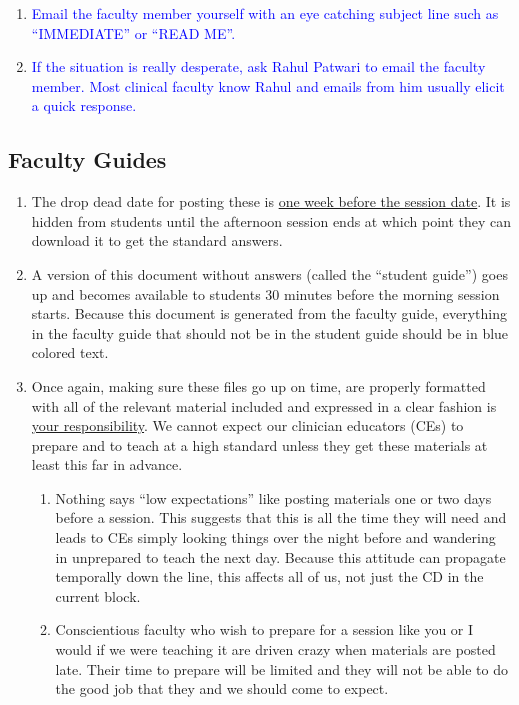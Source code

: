 \documentclass[11pt]{article}
\newcommand{\trsem}[1]{\textcolor{blue}{#1}}
\begin{document}
\begin{enumerate}
  \begin{enumerate}
    \def\labelenumii{\trsem{\alph{enumii}.}}
  \item \trsem{Email the faculty member yourself with an eye catching subject line such as ``IMMEDIATE'' or ``READ ME''.}
  \item \trsem{If the situation is really desperate, ask Rahul Patwari to email the faculty member.  Most clinical faculty know Rahul and emails from him usually elicit a quick response.}
  \end{enumerate}
\end{enumerate}

\subsection*{Faculty Guides}
\begin{enumerate}
\item  The drop dead date for posting these is \underline{one week before the session date}.  It is hidden from students until the afternoon session ends at which point they can download it to get the standard answers.
\item A version of this document without answers (called the ``student guide'') goes up and becomes available to students 30 minutes before the morning session starts.  Because this document is generated from the faculty guide, everything in the faculty guide that should not be in the student guide should be in blue colored text.
\item Once again, making sure these files go up on time, are properly formatted with all of the relevant material included and expressed in a clear fashion is \underline{your responsibility}.  We cannot expect our clinician educators (CEs) to prepare and to teach at a high standard unless they get these materials at least this far in advance.
  \begin{enumerate}
  \item Nothing says ``low expectations'' like posting materials one or two days before a session.  This suggests that this is all the time they will need and leads to CEs simply looking things over the night before and wandering in unprepared to teach the next day.  Because this attitude can propagate temporally down the line, this affects all of us, not just the CD in the current block.
  \item Conscientious faculty who wish to prepare for a session like you or I would if we were teaching it are driven crazy when materials are posted late.  Their time to prepare will be limited and they will not be able to do the good job that they and we should come to expect.

\end{enumerate}
\end{enumerate}
\end{document}
